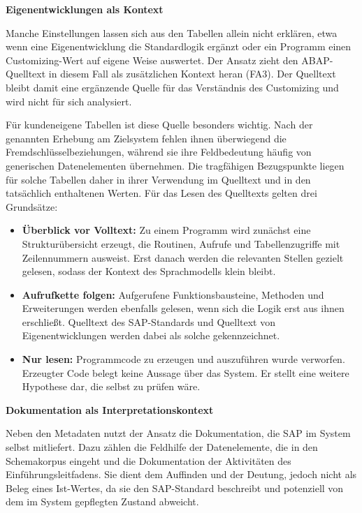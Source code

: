 \textbf{Eigenentwicklungen als Kontext}

Manche Einstellungen lassen sich aus den Tabellen allein nicht erklären, etwa wenn eine Eigenentwicklung die Standardlogik ergänzt oder ein Programm einen Customizing-Wert auf eigene Weise auswertet. Der Ansatz zieht den ABAP-Quelltext in diesem Fall als zusätzlichen Kontext heran (FA3). Der Quelltext bleibt damit eine ergänzende Quelle für das Verständnis des Customizing und wird nicht für sich analysiert.

Für kundeneigene Tabellen ist diese Quelle besonders wichtig. Nach der genannten Erhebung am Zielsystem fehlen ihnen überwiegend die Fremdschlüsselbeziehungen, während sie ihre Feldbedeutung häufig von generischen Datenelementen übernehmen. %
Die tragfähigen Bezugspunkte liegen für solche Tabellen daher in ihrer Verwendung im Quelltext und in den tatsächlich enthaltenen Werten. Für das Lesen des Quelltexts gelten drei Grundsätze:
\begin{itemize}
	\item \textbf{Überblick vor Volltext:} Zu einem Programm wird zunächst eine Strukturübersicht erzeugt, die Routinen, Aufrufe und Tabellenzugriffe mit Zeilennummern ausweist. Erst danach werden die relevanten Stellen gezielt gelesen, sodass der Kontext des Sprachmodells klein bleibt.
	\item \textbf{Aufrufkette folgen:} Aufgerufene Funktionsbausteine, Methoden und Erweiterungen werden ebenfalls gelesen, wenn sich die Logik erst aus ihnen erschließt. Quelltext des SAP-Standards und Quelltext von Eigenentwicklungen werden dabei als solche gekennzeichnet.
	\item \textbf{Nur lesen:} Programmcode zu erzeugen und auszuführen wurde verworfen. Erzeugter Code belegt keine Aussage über das System. Er stellt eine weitere Hypothese dar, die selbst zu prüfen wäre.
\end{itemize}

\textbf{Dokumentation als Interpretationskontext}

Neben den Metadaten nutzt der Ansatz die Dokumentation, die SAP im System selbst mitliefert. Dazu zählen die Feldhilfe der Datenelemente, die in den Schemakorpus eingeht und die Dokumentation der Aktivitäten des Einführungsleitfadens. Sie dient dem Auffinden und der Deutung, jedoch nicht als Beleg eines Ist-Wertes, da sie den SAP-Standard beschreibt und potenziell von dem im System gepflegten Zustand abweicht.

